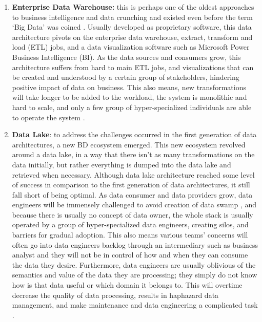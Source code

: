 \documentclass[review]{elsarticle}
\begin{document}
\begin{enumerate}
    \item \textbf{Enterprise Data Warehouse:} this is perhaps one of the oldest approaches to business intelligence and data crunching and existed even before the term `Big Data' was coined \cite{leonard2011design}. Usually developed as proprietary software, this data architecture pivots on the enterprise data warehouse, extract, transform and load (ETL) jobs, and a data visualization software such as Microsoft Power Business Intelligence (BI). As the data sources and consumers grow, this architecture suffers from hard to main ETL jobs, and visualizations that can be created and understood by a certain group of stakeholders, hindering positive impact of data on business. This also means, new transformations will take longer to be added to the workload, the system is monolithic and hard to scale, and only a few group of hyper-specialized individuals are able to operate the system \cite{ataei2022state}.
    \item \textbf{Data Lake}: to address the challenges occurred in the first generation of data architectures, a new BD ecosystem emerged. This new ecosystem revolved around a data lake, in a way that there isn't as many transformations on the data initially, but rather everything is dumped into the data lake and retrieved when necessary. Although data lake architecture reached some level of success in comparison to the first generation of data architectures, it still fall short of being optimal. As data consumer and data providers grow, data engineers will be immensely challenged to avoid creation of data swamp \cite{brackenbury2018draining}, and because there is usually no concept of data owner, the whole stack is usually operated by a group of hyper-specialized data engineers, creating silos, and barriers for gradual adoption. This also means various teams' concerns will often go into data engineers backlog through an intermediary such as business analyst and they will not be in control of how and when they can consume the data they desire. Furthermore, data engineers are usually oblivious of the semantics and value of the data they are processing; they simply do not know how is that data useful or which domain it belongs to. This will overtime decrease the quality of data processing, results in haphazard data management, and make maintenance and data engineering a complicated task \cite{ataei2023towards}. 

\end{enumerate}
\end{document}
